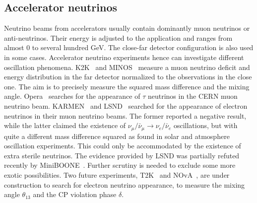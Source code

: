 \subsection{Accelerator  neutrinos}
\label{sec:acce}
Neutrino beams from accelerators usually contain dominantly muon neutrinos or anti-neutrinos. Their energy is adjusted to the application and ranges from almost 0 to several hundred GeV. The close-far detector configuration is also used in some cases.  Accelerator neutrino experiments hence can investigate different oscillation phenomena. K2K~\cite{K2K06} and MINOS~\cite{Min06} measure a muon neutrino deficit and energy distribution in the far detector normalized to the observations in the close one. The aim is to precisely measure the squared mass difference and the mixing angle. Opera~\cite{Ope06} searches for the appearance of $\tau$ neutrinos in the CERN muon neutrino beam. KARMEN~\cite{Kar03} and LSND~\cite{Dod06} searched for the appearance of electron neutrinos in their muon neutrino beams. The former reported a negative result, while the latter claimed the existence of $\nu_{\mu}/\bar{\nu}_{\mu} \rightarrow \nu_{e}/\bar{\nu}_{e}$ oscillations, but with quite a different mass difference squared as found in solar and atmosphere oscillation experiments. This could only be accommodated by the existence of extra sterile neutrinos. The evidence provided by LSND was partially refuted recently by MiniBOONE~\cite{Agu07}. Further scrutiny is needed to exclude some more exotic possibilities. Two future experiments, T2K~\cite{T2K05} and NOvA~\cite{Nov05}, are under construction to search for electron neutrino appearance, to measure the mixing angle $\theta_{13}$ and the CP violation phase $\delta$.

